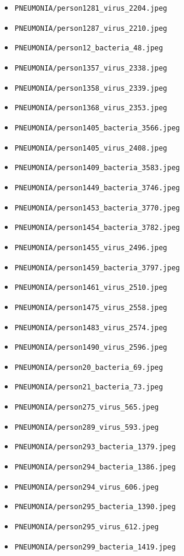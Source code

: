 \begin{itemize}
\item \texttt{PNEUMONIA/person1281\_virus\_2204.jpeg}
\item \texttt{PNEUMONIA/person1287\_virus\_2210.jpeg}
\item \texttt{PNEUMONIA/person12\_bacteria\_48.jpeg}
\item \texttt{PNEUMONIA/person1357\_virus\_2338.jpeg}
\item \texttt{PNEUMONIA/person1358\_virus\_2339.jpeg}
\item \texttt{PNEUMONIA/person1368\_virus\_2353.jpeg}
\item \texttt{PNEUMONIA/person1405\_bacteria\_3566.jpeg}
\item \texttt{PNEUMONIA/person1405\_virus\_2408.jpeg}
\item \texttt{PNEUMONIA/person1409\_bacteria\_3583.jpeg}
\item \texttt{PNEUMONIA/person1449\_bacteria\_3746.jpeg}
\item \texttt{PNEUMONIA/person1453\_bacteria\_3770.jpeg}
\item \texttt{PNEUMONIA/person1454\_bacteria\_3782.jpeg}
\item \texttt{PNEUMONIA/person1455\_virus\_2496.jpeg}
\item \texttt{PNEUMONIA/person1459\_bacteria\_3797.jpeg}
\item \texttt{PNEUMONIA/person1461\_virus\_2510.jpeg}
\item \texttt{PNEUMONIA/person1475\_virus\_2558.jpeg}
\item \texttt{PNEUMONIA/person1483\_virus\_2574.jpeg}
\item \texttt{PNEUMONIA/person1490\_virus\_2596.jpeg}
\item \texttt{PNEUMONIA/person20\_bacteria\_69.jpeg}
\item \texttt{PNEUMONIA/person21\_bacteria\_73.jpeg}
\item \texttt{PNEUMONIA/person275\_virus\_565.jpeg}
\item \texttt{PNEUMONIA/person289\_virus\_593.jpeg}
\item \texttt{PNEUMONIA/person293\_bacteria\_1379.jpeg}
\item \texttt{PNEUMONIA/person294\_bacteria\_1386.jpeg}
\item \texttt{PNEUMONIA/person294\_virus\_606.jpeg}
\item \texttt{PNEUMONIA/person295\_bacteria\_1390.jpeg}
\item \texttt{PNEUMONIA/person295\_virus\_612.jpeg}
\item \texttt{PNEUMONIA/person299\_bacteria\_1419.jpeg}

\end{itemize}
